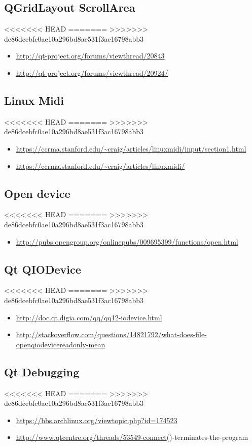 \documentclass[9pt,b5paper]{article}
\begin{document}
\subsection{QGridLayout ScrollArea}
<<<<<<< HEAD
\label{sec-18-10}
=======
\label{sec-17-10}
>>>>>>> de86dcebfc0ae10a296bd8ae531f3ac16798abb3
\begin{itemize}
\item \url{http://qt-project.org/forums/viewthread/20843}
\item \url{http://qt-project.org/forums/viewthread/20924/}
\end{itemize}
\subsection{Linux Midi}
<<<<<<< HEAD
\label{sec-18-11}
=======
\label{sec-17-11}
>>>>>>> de86dcebfc0ae10a296bd8ae531f3ac16798abb3
\begin{itemize}
\item \url{https://ccrma.stanford.edu/~craig/articles/linuxmidi/input/section1.html}
\item \url{https://ccrma.stanford.edu/~craig/articles/linuxmidi/}
\end{itemize}
\subsection{Open device}
<<<<<<< HEAD
\label{sec-18-12}
=======
\label{sec-17-12}
>>>>>>> de86dcebfc0ae10a296bd8ae531f3ac16798abb3
\begin{itemize}
\item \url{http://pubs.opengroup.org/onlinepubs/009695399/functions/open.html}
\end{itemize}
\subsection{Qt QIODevice}
<<<<<<< HEAD
\label{sec-18-13}
=======
\label{sec-17-13}
>>>>>>> de86dcebfc0ae10a296bd8ae531f3ac16798abb3
\begin{itemize}
\item \url{http://doc.qt.digia.com/qq/qq12-iodevice.html}
\item \url{http://stackoverflow.com/questions/14821792/what-does-file-openqiodevicereadonly-mean}
\end{itemize}
\subsection{Qt Debugging}
<<<<<<< HEAD
\label{sec-18-14}
=======
\label{sec-17-14}
>>>>>>> de86dcebfc0ae10a296bd8ae531f3ac16798abb3
\begin{itemize}
\item \url{https://bbs.archlinux.org/viewtopic.php?id=174523}
\item \url{http://www.qtcentre.org/threads/53549-connect}()-terminates-the-program
\end{itemize}
\end{document}
